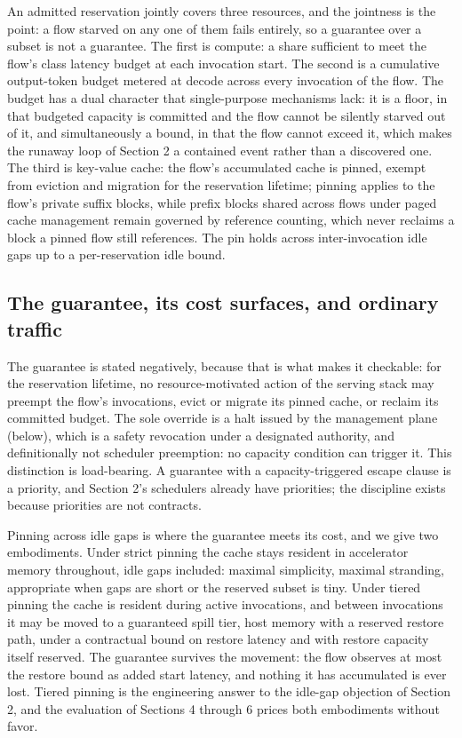 An admitted reservation jointly covers three resources, and the jointness
is the point: a flow starved on any one of them fails entirely, so a
guarantee over a subset is not a guarantee. The first is compute: a share
sufficient to meet the flow's class latency budget at each invocation
start. The second is a cumulative output-token budget metered at decode
across every invocation of the flow. The budget has a dual character that
single-purpose mechanisms lack: it is a floor, in that budgeted capacity
is committed and the flow cannot be silently starved out of it, and
simultaneously a bound, in that the flow cannot exceed it, which makes
the runaway loop of Section 2 a contained event rather than a discovered
one. The third is key-value cache: the flow's accumulated cache is
pinned, exempt from eviction and migration for the reservation lifetime;
pinning applies to the flow's private suffix blocks, while prefix blocks
shared across flows under paged cache management remain governed by
reference counting, which never reclaims a block a pinned flow still
references. The pin holds across inter-invocation idle gaps up to a
per-reservation idle bound.

\subsection{The guarantee, its cost surfaces, and ordinary traffic}

The guarantee is stated negatively, because that is what makes it
checkable: for the reservation lifetime, no resource-motivated action of
the serving stack may preempt the flow's invocations, evict or migrate
its pinned cache, or reclaim its committed budget. The sole override is a halt issued by the management plane (below), which is a safety
revocation under a designated authority, and definitionally not scheduler
preemption: no capacity condition can trigger it. This distinction is
load-bearing. A guarantee with a capacity-triggered escape clause is a
priority, and Section 2's schedulers already have priorities; the
discipline exists because priorities are not contracts.

Pinning across idle gaps is where the guarantee meets its cost, and we
give two embodiments. Under strict pinning the cache stays resident in
accelerator memory throughout, idle gaps included: maximal simplicity,
maximal stranding, appropriate when gaps are short or the reserved subset
is tiny. Under tiered pinning the cache is resident during active
invocations, and between invocations it may be moved to a guaranteed
spill tier, host memory with a reserved restore path, under a contractual
bound on restore latency and with restore capacity itself reserved. The
guarantee survives the movement: the flow observes at most the restore
bound as added start latency, and nothing it has accumulated is ever
lost. Tiered pinning is the engineering answer to the idle-gap objection
of Section 2, and the evaluation of Sections 4 through 6 prices both
embodiments without favor.

